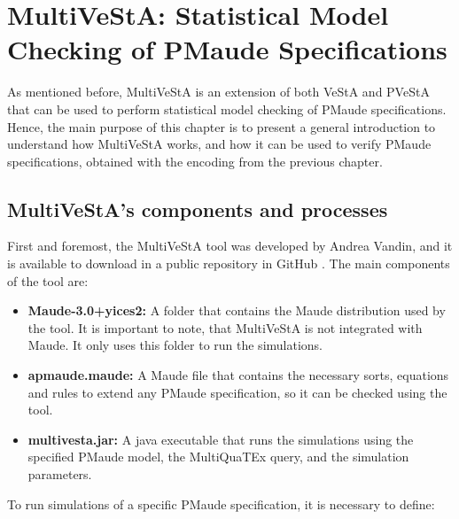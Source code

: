 \chapter{MultiVeStA: Statistical Model Checking of PMaude Specifications}

As mentioned before, MultiVeStA is an extension of both VeStA and PVeStA that can be used to perform statistical model checking of PMaude specifications. Hence, the main purpose of this chapter is to present a general introduction to understand how MultiVeStA works, and how it can be used to verify PMaude specifications, obtained with the encoding from the previous chapter.

\section{MultiVeStA's components and processes}
First and foremost, the MultiVeStA tool was developed by Andrea Vandin, and it is available to download in a public repository in GitHub \cite{multiGit}. The main components of the tool are:
\begin{itemize}
    \item \textbf{Maude-3.0+yices2:} A folder that contains the Maude distribution used by the tool. It is important to note, that MultiVeStA is not integrated with Maude. It only uses this folder to run the simulations.
    \item \textbf{apmaude.maude:} A Maude file that contains the necessary sorts, equations and rules to extend any PMaude specification, so it can be checked using the tool. 
    \item \textbf{multivesta.jar:} A java executable that runs the simulations using the specified PMaude model, the MultiQuaTEx query, and the simulation parameters.
\end{itemize}

To run simulations of a specific PMaude specification, it is necessary to define:

